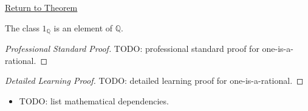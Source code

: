 \newpage
{}
\label{prf:one-is-a-rational}

\begin{remark*}[Return]
\hyperref[thm:one-is-a-rational]{Return to Theorem}
\end{remark*}

\begin{theorem*}
The class $1_{\mathbb{Q}}$ is an element of $\mathbb{Q}$.
\end{theorem*}

\begin{proof}[Professional Standard Proof]
\LRAProofBodyStart
TODO: professional standard proof for one-is-a-rational.
\end{proof}

\begin{proof}[Detailed Learning Proof]
\LRAProofBodyStart
TODO: detailed learning proof for one-is-a-rational.
\end{proof}

\begin{remark*}
\end{remark*}

\begin{dependencies}
\begin{itemize}
  \item TODO: list mathematical dependencies.
\end{itemize}
\end{dependencies}

\clearpage
